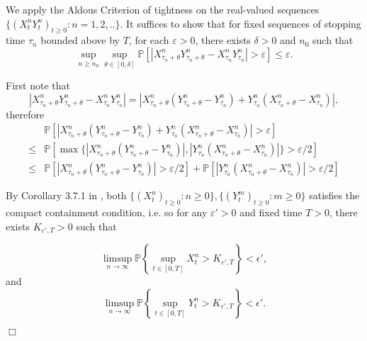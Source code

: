 \documentclass[12pt]{article}
\newenvironment {proof}{{\noindent\bf Proof }}{\hfill $\Box$ \medskip}
\begin{document}
\begin{proof}
We apply the Aldous Criterion of tightness on the real-valued sequences
$\{(X^n_tY^n_t)_{t \geq 0}: n=1,2,.. \}$. 
It suffices to show that
for fixed sequences of stopping time $\tau_n$ bounded above by $T$,
for each $\varepsilon>0$,
there exists $\delta > 0$ and $n_0$ such that
\begin{equation}
\sup_{n \geq n_0}\sup_{\theta \in [0, \delta]} \mathbb{P}\left[|X^n_{\tau_n+\theta}Y^n_{\tau_n+\theta} - X^n_{\tau_n}Y^n_{\tau_n} | > \varepsilon \right] \leq \varepsilon.
\end{equation}

First note that 
\begin{equation}
|X^n_{\tau_n+\theta}Y^n_{\tau_n+\theta} - X^n_{\tau_n}Y^n_{\tau_n} |
= |X^n_{\tau_n+\theta}(Y^n_{\tau_n+\theta}-Y^n_{\tau_n}) +Y^n_{\tau_n}( X^n_{\tau_n+\theta}- X^n_{\tau_n})|,
\end{equation}
therefore
\begin{equation}
\begin{aligned}
& \mathbb{P}\left[|X^n_{\tau_n+\theta}(Y^n_{\tau_n+\theta}-Y^n_{\tau_n}) +Y^n_{\tau_n}( X^n_{\tau_n+\theta}- X^n_{\tau_n})| > \varepsilon \right]\\
 \leq &
\mathbb{P}\left[\max\{|X^n_{\tau_n+\theta}(Y^n_{\tau_n+\theta}-Y^n_{\tau_n})|, | Y^n_{\tau_n}( X^n_{\tau_n+\theta}- X^n_{\tau_n}) |\}> \varepsilon/2 \right]\\
\leq & \mathbb{P}\left[|X^n_{\tau_n+\theta}(Y^n_{\tau_n+\theta}-Y^n_{\tau_n})|> \varepsilon/2 \right] + \mathbb{P}\left[ | Y^n_{\tau_n}( X^n_{\tau_n+\theta}- X^n_{\tau_n}) |> \varepsilon/2 \right]
\end{aligned}
\end{equation}

By Corollary 3.7.1 in \cite{EK}, both $\{(X^n_t)_{t \geq 0}: n \geq 0\}, \{(Y^m_t)_{t \geq 0}: m \geq 0\}$ satisfies the compact containment condition, i.e. so for any $\varepsilon'>0$ and fixed time $T> 0$, there exists $K_{\varepsilon',T}>0$ such that 

\begin{equation}
 \limsup_{n \to \infty} \mathbb{P}\left\{ \sup_{t\in [0,T]}X^n_t > K_{\varepsilon',T} \right\} < \epsilon',
\end{equation}
and 
\begin{equation}
 \limsup_{n \to \infty} \mathbb{P}\left\{ \sup_{t\in [0,T]}Y^n_t > K_{\varepsilon',T} \right\} < \epsilon'.
\end{equation}


\end{proof}
\end{document}
